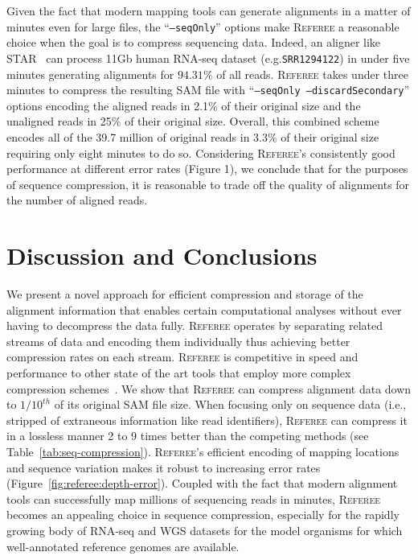 \documentclass[12pt]{cmuthesis}
\newcommand{\refer}{\textsc{Referee}\xspace}
\begin{document}

  Given the fact that modern mapping tools can generate alignments in a matter of minutes even for large files, the ``\texttt{--seqOnly}'' options make \refer a reasonable choice when the goal is to compress sequencing data. Indeed, an  aligner like STAR~\cite{DobinSTAR} can process 11Gb human RNA-seq dataset (e.g.\@ \texttt{SRR1294122}) in under five minutes generating alignments for $94.31\%$ of all reads. \refer takes under three minutes to compress the resulting SAM file with ``\texttt{--seqOnly --discardSecondary}'' options encoding the aligned reads in 2.1\% of their original size and the unaligned reads in 25\% of their original size. Overall, this combined scheme encodes all of the 39.7 million of original reads in 3.3\% of their original size requiring only eight minutes to do so. Considering \refer's consistently good performance at different error rates (Figure 1), we conclude that for the purposes of sequence compression, it is reasonable to trade off the quality of alignments for the number of aligned reads.





\section{Discussion and Conclusions}

We present a novel approach for efficient compression and storage of the  alignment information that enables certain computational analyses without ever having to decompress the data fully. \refer operates by separating related streams of data and encoding them individually thus achieving better compression rates on each stream. \refer is competitive in speed and performance to other state of the art tools that employ more complex compression schemes~\cite{Sahinalp2015,Jones2012}. We show that \refer can compress alignment data down to $1/10^{th}$ of its original SAM file size. When focusing only on sequence data (i.e., stripped of extraneous information like read identifiers), \refer can compress it in a lossless manner 2 to 9 times better than the competing methods (see Table~\ref{tab:seq-compression}). \refer's efficient encoding of mapping locations and sequence variation makes it robust to increasing error rates (Figure~\ref{fig:referee:depth-error}). Coupled with the fact that modern alignment tools can successfully map millions of sequencing reads in minutes, \refer becomes an appealing choice in sequence compression, especially for the rapidly growing body of RNA-seq and WGS datasets for the model organisms for which well-annotated reference genomes are available.
\end{document}
